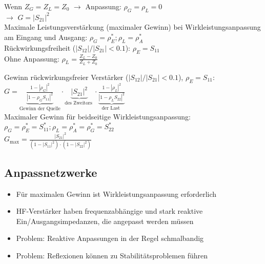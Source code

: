 \documentclass[english]{latex4ei/latex4ei_sheet}
\begin{document}
\begin{sectionbox}
	Wenn $Z_G = Z_L = Z_0$ $\rightarrow$ Anpassung: $\rho_G = \rho_L = 0$\\
	$\rightarrow$ $G = |S_{21}|^2$\\
	
	Maximale Leistungsverstärkung (maximaler Gewinn) bei Wirkleistungsanpassung am Eingang und Ausgang:
	$\rho_{G}=\rho_{E}^{*} ; \rho_{L}=\rho_{A}^{*}$\\

	Rückwirkungsfreiheit ($|S_{12}| / |S_{21}| < 0.1$): $\rho_{E} = S_{11}$\\

	Ohne Anpassung: $\rho_{L} = \frac{Z_{L}-Z_{0}}{Z_{L}+Z_{0}}$ \\
	\begin{emphbox}
		Gewinn rückwirkungsfreier Verstärker ($|S_{12}| / |S_{21}| < 0.1$), $\rho_{E}=S_{11}$:\\
		$G=\underbrace{\frac{1-\left|\rho_{G}\right|^{2}} {\left|1-\rho_{G} S_{11}\right|^{2}}}_{\text{Gewinn der Quelle}}\cdot \underbrace{\left|S_{21}\right|^{2}}_{\text {des Zweitors }} \cdot  \underbrace{\frac{1-\left|\rho_{L}\right|^{2}}{\left|1-\rho_{L} S_{22}\right|^{2}}}_{\text {der Last }}$\\
		
		Maximaler Gewinn für beidseitige Wirkleistungsanpassung: $\rho_{G}=\rho_{E}^{*}=S_{11}^{*} ; \rho_{L}=\rho_{A}^{*}=\rho_{G}^{*}=S_{22}^{*}$\\
		$G_{\max }=\frac{\left|S_{21}\right|^{2}}{\left(1-\left|S_{11}\right|^{2}\right) \cdot\left(1-\left|S_{22}\right|^{2}\right)}$
	\end{emphbox}
\end{sectionbox}	
\begin{sectionbox}
	\subsection{Anpassnetzwerke}
	\begin{itemize}
		\item Für maximalen Gewinn ist Wirkleistungsanpassung erforderlich
		\item HF-Verstärker haben frequenzabhängige und stark reaktive Ein/Ausgangsimpedanzen, die angepasst werden müssen
		\item Problem: Reaktive Anpassungen in der Regel schmalbandig
		\item Problem: Reflexionen können zu Stabilitätsproblemen führen
	\end{itemize}
\end{sectionbox}
\end{document}
